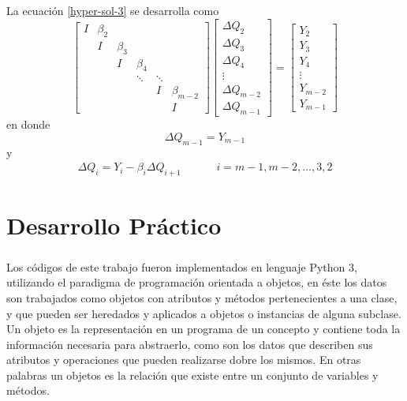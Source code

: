 \documentclass[letterpaper, openright, 12pt]{book}
\begin{document}
	\paragraph*{}
		La ecuación \ref{hyper-sol-3} se desarrolla como
		\begin{equation}
			\begin{bmatrix}
				I & \beta_2\\
				& I & \beta_3\\
				& & I & \beta_4\\
				& & & \ddots & \ddots\\
				& & & & I & \beta_{m-2}\\
				& & & & & I
			\end{bmatrix}
			\begin{bmatrix}
				\Delta Q_2\\
				\Delta Q_3\\
				\Delta Q_4\\
				\vdots\\
				\Delta Q_{m-2}\\
				\Delta Q_{m-1}
			\end{bmatrix}
			=
			\begin{bmatrix}
				Y_2\\
				Y_3\\
				Y_4\\
				\vdots\\
				Y_{m-2}\\
				Y_{m-1}
			\end{bmatrix}
		\end{equation}
		en donde
		\begin{equation}
			\Delta Q_{m-1} = Y_{m-1}
		\end{equation}
		y
		\begin{align}
			\Delta Q_i = Y_i - \beta_i \Delta Q_{i+1} &&&& i = m-1, m-2, \dots, 3, 2
		\end{align}
		
			
				
	
\chapter{Desarrollo Práctico}
	\paragraph*{}
		Los códigos de este trabajo fueron implementados en lenguaje Python 3, utilizando el paradigma de programación orientada a objetos, en éste los datos son trabajados como objetos con atributos y métodos pertenecientes a una clase, y que pueden ser heredados y aplicados a objetos o instancias de alguna subclase. Un objeto  es la representación en un programa de un concepto y contiene toda la información necesaria para abstraerlo, como son los datos que describen sus atributos y operaciones que pueden realizarse dobre los mismos.  En otras palabras un objetos es la relación que existe entre un conjunto de variables y métodos.
	
\end{document}
